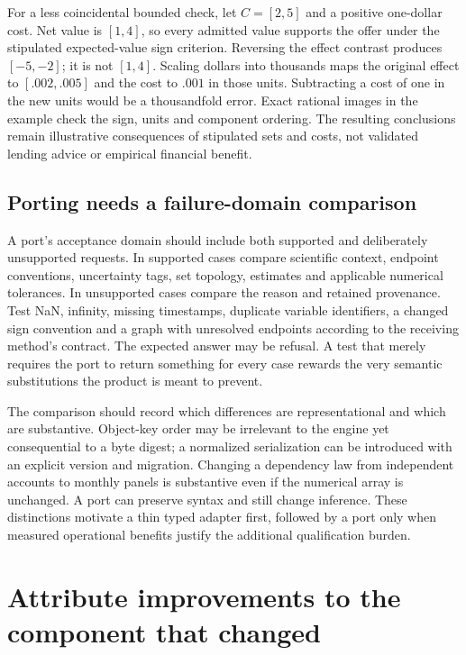 For a less coincidental bounded check, let $C=[2,5]$ and a positive
one-dollar cost. Net value is $[1,4]$, so every admitted value supports
the offer under the stipulated expected-value sign criterion. Reversing
the effect contrast produces $[-5,-2]$; it is not $[1,4]$. Scaling
dollars into thousands maps the original effect to $[.002,.005]$ and
the cost to $.001$ in those units. Subtracting a cost of one in the new
units would be a thousandfold error. Exact rational images in the example
check the sign, units and component ordering. The resulting conclusions
remain illustrative consequences of stipulated sets and costs, not
validated lending advice or empirical financial benefit.
\citep{exec14_l6_adapter_exact}

\subsection{Porting needs a failure-domain comparison}

A port's acceptance domain should include both supported and deliberately
unsupported requests. In supported cases compare scientific context,
endpoint conventions, uncertainty tags, set topology, estimates and
applicable numerical tolerances. In unsupported cases compare the reason
and retained provenance. Test NaN, infinity, missing timestamps, duplicate
variable identifiers, a changed sign convention and a graph with unresolved
endpoints according to the receiving method's contract. The expected
answer may be refusal. A test that merely requires the port to return
something for every case rewards the very semantic substitutions the
product is meant to prevent.

The comparison should record which differences are representational and
which are substantive. Object-key order may be irrelevant to the engine
yet consequential to a byte digest; a normalized serialization can be
introduced with an explicit version and migration. Changing a dependency
law from independent accounts to monthly panels is substantive even if
the numerical array is unchanged. A port can preserve syntax and still
change inference. These distinctions motivate a thin typed adapter first,
followed by a port only when measured operational benefits justify the
additional qualification burden.

\section{Attribute improvements to the component that changed}
\label{exec14:l6-factorial}


